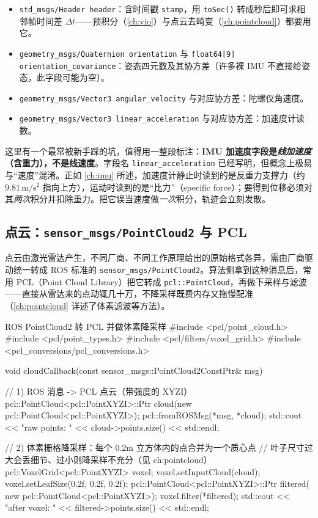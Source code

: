 \begin{itemize}
  \item \verb|std_msgs/Header header|：含时间戳 \verb|stamp|，用 \verb|toSec()| 转成秒后即可求相邻帧时间差 $\Delta t$——预积分（\cref{ch:vio}）与点云去畸变（\cref{ch:pointcloud}）都要用它。
  \item \verb|geometry_msgs/Quaternion orientation| 与 \verb|float64[9] orientation_covariance|：姿态四元数及其协方差（许多裸 IMU 不直接给姿态，此字段可能为空）。
  \item \verb|geometry_msgs/Vector3 angular_velocity| 与对应协方差：陀螺仪角速度。
  \item \verb|geometry_msgs/Vector3 linear_acceleration| 与对应协方差：加速度计读数。
\end{itemize}

这里有一个最常被新手踩的坑，值得用一整段标注：\textbf{IMU 加速度字段是\emph{线加速度}（含重力），不是线速度}。字段名 \verb|linear_acceleration| 已经写明，但概念上极易与“速度”混淆。正如 \cref{ch:imu} 所述，加速度计静止时读到的是反重力支撑力（约 $9.81\,\mathrm{m/s^2}$ 指向上方），运动时读到的是“比力”（specific force）；要得到位移必须对其\emph{两次}积分并扣除重力。把它误当速度做\emph{一次}积分，轨迹会立刻发散。

\subsection{点云：\texttt{sensor\_msgs/PointCloud2} 与 PCL}

点云由激光雷达产生，不同厂商、不同工作原理给出的原始格式各异，需由厂商驱动统一转成 ROS 标准的 \verb|sensor_msgs/PointCloud2|。算法侧拿到这种消息后，常用 PCL（Point Cloud Library）把它转成 \verb|pcl::PointCloud|，再做下采样与滤波——直接从雷达来的点动辄几十万，不降采样既费内存又拖慢配准（\cref{ch:pointcloud} 详述了体素滤波等方法）。

\begin{codebox}[C++]{ROS PointCloud2 转 PCL 并做体素降采样}
#include <pcl/point_cloud.h>
#include <pcl/point_types.h>
#include <pcl/filters/voxel_grid.h>
#include <pcl_conversions/pcl_conversions.h>

void cloudCallback(const sensor_msgs::PointCloud2ConstPtr& msg) {
  // 1) ROS 消息 -> PCL 点云（带强度的 XYZI）
  pcl::PointCloud<pcl::PointXYZI>::Ptr cloud(new pcl::PointCloud<pcl::PointXYZI>);
  pcl::fromROSMsg(*msg, *cloud);
  std::cout << "raw points: " << cloud->points.size() << std::endl;

  // 2) 体素栅格降采样：每个 0.2m 立方体内的点合并为一个质心点
  //    叶子尺寸过大会丢细节、过小则降采样不充分（见 ch:pointcloud）
  pcl::VoxelGrid<pcl::PointXYZI> voxel;
  voxel.setInputCloud(cloud);
  voxel.setLeafSize(0.2f, 0.2f, 0.2f);
  pcl::PointCloud<pcl::PointXYZI>::Ptr filtered(
      new pcl::PointCloud<pcl::PointXYZI>);
  voxel.filter(*filtered);
  std::cout << "after voxel: " << filtered->points.size() << std::endl;
}
\end{codebox}

